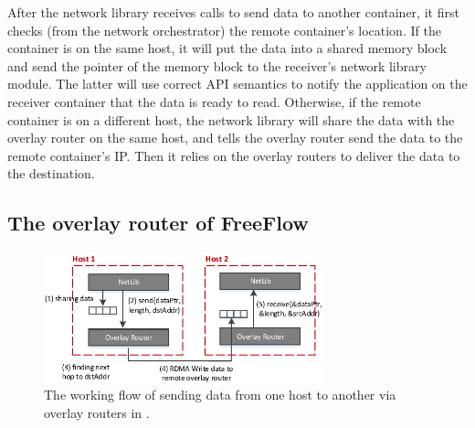
After the network library receives calls to send data to another container, it
first checks (from the network orchestrator) the remote container's location. If
the container is on the same host, it will put the data into a shared memory
block and send the pointer of the memory block to the receiver's network library
module. The latter will use correct API semantics to notify the application on
the receiver container that the data is ready to read.  Otherwise, if the remote
container is on a different host, the network library will share the data with
the overlay router on the same host, and tells the overlay router send the data
to the remote container's IP. Then it relies on the overlay routers to deliver
the data to the destination. 

\subsection{The overlay router of FreeFlow}

\begin{figure}[t!] 
     \centering 
     \includegraphics[width=3.2in]{figures/overlayrouter.pdf} 
    \caption{\label{fig:overlayrouter} The working flow of sending data from one host to another via overlay routers in \sysname.} 
\end{figure} 

